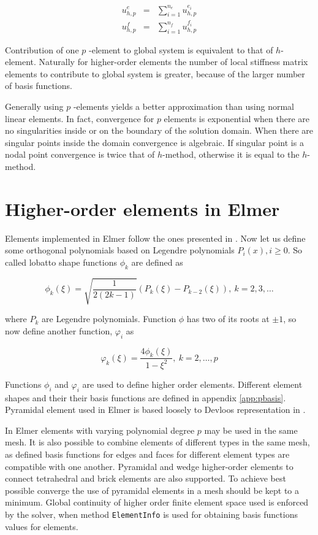 \begin{eqnarray*}
u_{h,p}^e &=& \sum_{i=1}^{n_e} u_{h,p}^{e_i} \\
u_{h,p}^f &=& \sum_{i=1}^{n_f} u_{h,p}^{f_i}
\end{eqnarray*} 

Contribution of one $p$ -element to global system is equivalent to that of $h$-element. Naturally for higher-order elements the number of local stiffness matrix elements to contribute to global system is greater, because of the larger number of basis functions.  

Generally using $p$ -elements yields a better approximation than using normal linear elements. In fact, convergence for $p$ elements is exponential when there are no singularities inside or on the boundary of the solution domain. When there are singular points inside the domain convergence is algebraic. If singular point is a nodal point convergence is twice that of $h$-method, otherwise it is equal to the $h$-method.

\section{Higher-order elements in Elmer}

Elements implemented in Elmer follow the ones presented in \cite{SzaboBabu}. Now let us define some orthogonal polynomials based on Legendre polynomials $P_i(x), i\geq 0$. So called lobatto shape functions $\phi_k$ are defined as 

\begin{equation}
\phi_k(\xi)=\sqrt{\frac{1}{2(2k-1)}}(P_{k}(\xi)-P_{k-2}(\xi)),\
k=2,3,\ldots 
\end{equation}

\noindent where $P_k$ are Legendre polynomials. Function $\phi$ has two of its roots at $\pm 1$, so now define another function, $\varphi_i$ as

\begin{equation}
\varphi_k(\xi)=\frac{4\phi_k(\xi)}{1-\xi^2},\ k=2,\ldots,p
\end{equation}

\noindent Functions $\phi_i$ and $\varphi_i$ are used to define higher order elements. Different element shapes and their their basis functions are defined in appendix \ref{app:pbasis}. Pyramidal element used in Elmer is based loosely to Devloos representation in \cite{Devloo}. 

In Elmer elements with varying polynomial degree $p$ may be used in the same mesh. It is also possible to combine elements of different types in the same mesh, as defined basis functions for edges and faces for different element types are compatible with one another. Pyramidal and wedge higher-order elements to connect tetrahedral and brick elements are also supported. To achieve best possible converge the use of pyramidal elements in a mesh should be kept to a minimum. Global continuity of higher order finite element space used is enforced by the solver, when method \texttt{ElementInfo} is used for obtaining basis functions values for elements.  

